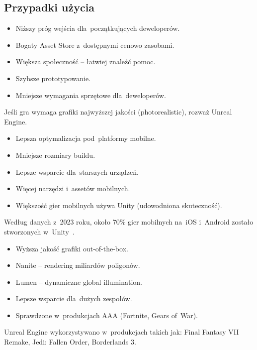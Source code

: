\subsection{Przypadki użycia}



\begin{itemize}
    \item Niższy próg wejścia dla~początkujących deweloperów.
    \item Bogaty Asset Store z~dostępnymi cenowo zasobami.
    \item Większa społeczność -- łatwiej znaleźć pomoc.
    \item Szybsze prototypowanie.
    \item Mniejsze wymagania sprzętowe dla~deweloperów.
\end{itemize}

Jeśli gra wymaga grafiki najwyższej jakości (photorealistic), rozważ Unreal Engine.



\begin{itemize}
    \item Lepsza optymalizacja pod~platformy mobilne.
    \item Mniejsze rozmiary buildu.
    \item Lepsze wsparcie dla~starszych urządzeń.
    \item Więcej narzędzi i~assetów mobilnych.
    \item Większość gier mobilnych używa Unity (udowodniona skuteczność).
\end{itemize}

Według danych z~2023 roku, około 70\% gier mobilnych na~iOS i~Android zostało stworzonych w~Unity~\cite{statista_unity_market, unity_gaming_report}.



\begin{itemize}
    \item Wyższa jakość grafiki out-of-the-box.
    \item Nanite -- rendering miliardów poligonów.
    \item Lumen -- dynamiczne global illumination.
    \item Lepsze wsparcie dla~dużych zespołów.
    \item Sprawdzone w~produkcjach AAA (Fortnite, Gears of~War).
\end{itemize}

Unreal Engine wykorzystywano w~produkcjach takich jak: Final Fantasy VII Remake, Jedi: Fallen Order, Borderlands 3.




